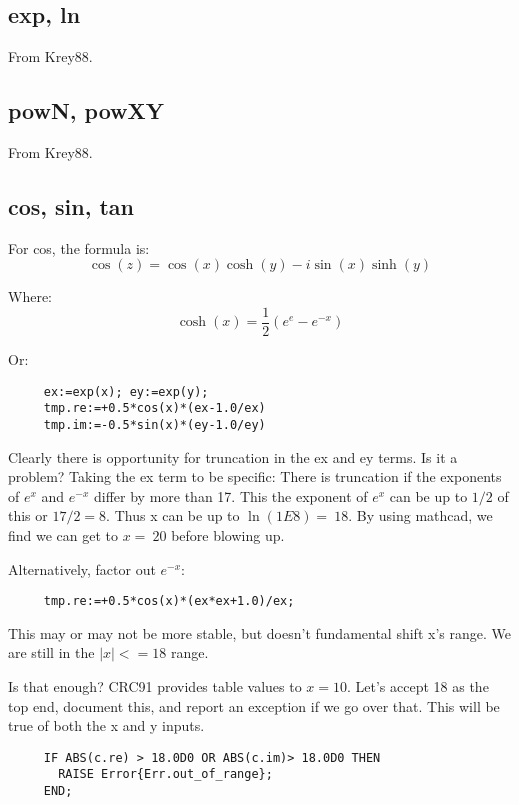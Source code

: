 \subsection*{exp, ln}
From Krey88.

\subsection*{powN, powXY}
From Krey88.


\subsection*{cos, sin, tan}
For cos, the formula is:
\begin{equation}
  \cos(z)=\cos(x)\cosh(y) - i \sin(x)\sinh(y)
\end{equation}
     
Where:
\begin{equation}
  \cosh(x)=\frac{1}{2}(e^{e} - e^{-x})
\end{equation}
     
Or:
\begin{verbatim}
     ex:=exp(x); ey:=exp(y);
     tmp.re:=+0.5*cos(x)*(ex-1.0/ex)
     tmp.im:=-0.5*sin(x)*(ey-1.0/ey)
\end{verbatim}

Clearly there is opportunity for truncation in the ex and ey
terms.  Is it a problem? Taking the ex term to be specific:
There is truncation if the exponents of $e^x$ and $e^{-x}$ differ
by more than 17.  This the exponent of $e^x$ can be up to $1/2$
of this or $17/2 = 8$.  Thus x can be up to $\ln(1E8)=~18$.  By
using mathcad, we find we can get to $x=~20$ before blowing
up.

Alternatively, factor out $e^{-x}$:
\begin{verbatim}
     tmp.re:=+0.5*cos(x)*(ex*ex+1.0)/ex;
\end{verbatim}

This may or may not be more stable, but doesn't fundamental
shift x's range.  We are still in the $|x|<=18$ range.

Is that enough?  CRC91 provides table values to $x=10$.  Let's
accept 18 as the top end, document this, and report an
exception if we go over that.  This will be true of both the
x and y inputs.
\begin{tt} \begin{verbatim}
     IF ABS(c.re) > 18.0D0 OR ABS(c.im)> 18.0D0 THEN
       RAISE Error{Err.out_of_range};
     END;
\end{verbatim} \end{tt}

